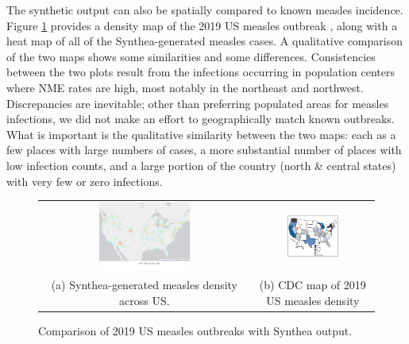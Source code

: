 \documentclass[12pt]{article}
\begin{document}
The synthetic output can also be spatially compared to known measles incidence.  Figure \ref{fig: map-comparison} provides a density map of the 2019 US measles outbreak \cite{cdc-measles-increases}, along with a heat map of all of the Synthea-generated measles cases.  A qualitative comparison of the two maps shows some similarities and some differences.  Consistencies between the two plots result from the infections occurring in population centers where NME rates are high, most notably in the northeast and northwest.  Discrepancies are inevitable; other than preferring populated areas for measles infections, we did not make an effort to geographically match known outbreaks.  What is important is the qualitative similarity between the two maps: each as a few places with large numbers of cases, a more substantial number of places with low infection counts, and a large portion of the country (north \& central states) with very few or zero infections.  

\begin{figure}[!hbt]\centering
    \begin{tabular}{cc}
        \includegraphics[width=0.45\textwidth]{figures/synthea-measles-density-gray.png} &
        \includegraphics[width=0.45\textwidth]{figures/cdc-measles-density.png} \\
        (a) Synthea-generated measles density across US. &
        (b) CDC map of 2019 US measles density
    \end{tabular}
    \caption{Comparison of 2019 US measles outbreaks with Synthea output. \label{fig: map-comparison}}
\end{figure}
\end{document}
